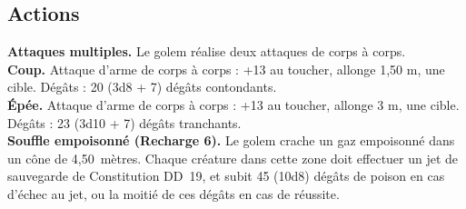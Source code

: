 \begin{figure*}[hbp]
{\begin{minipage}[c]{.45\linewidth}
    \subsection*{Actions}
    {\bfseries Attaques multiples.} Le golem réalise deux attaques de corps à corps.\\
    {\bfseries Coup.} Attaque d'arme de corps à corps : +13 au toucher, allonge 1,50 m, une cible. 
               Dégâts : 20 (3d8 + 7) dégâts contondants. \\
    {\bfseries Épée.} Attaque d'arme de corps à corps : +13 au toucher, allonge 3 m, une cible. 
               Dégâts : 23 (3d10 + 7) dégâts tranchants. \\
    {\bfseries Souffle empoisonné (Recharge 6).} Le golem crache un gaz empoisonné dans un cône de 
               4,50~mètres. Chaque créature dans cette zone doit effectuer un jet de sauvegarde de 
               Constitution DD~19, et subit 45 (10d8) dégâts de poison en cas d'échec au jet, ou la moitié 
               de ces dégâts en cas de réussite.
  \end{minipage}
}%
\end{figure*}

